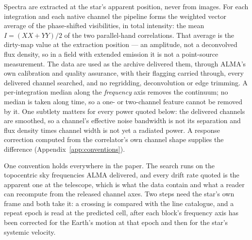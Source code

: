 Spectra are extracted at the star's apparent position, never from images.
For each integration and each native channel the pipeline forms the weighted
vector average of the phase-shifted visibilities, in total intensity: the
mean $I=(XX+YY)/2$ of the two parallel-hand correlations. That average is the
dirty-map value at the extraction position --- an amplitude, not a
deconvolved flux density, so in a field with extended emission it is not a
point-source measurement. The data are used as the archive delivered them,
through ALMA's own calibration and quality assurance, with their flagging
carried through, every delivered channel searched, and no regridding,
deconvolution or edge trimming. A per-integration median along the
\emph{frequency} axis removes the continuum; no median is taken along
time, so a one- or two-channel feature cannot be removed by it. One
subtlety matters for every power quoted below: the delivered channels are
smoothed, so a channel's effective noise bandwidth is not its separation
and flux density times channel width is not yet a radiated power. A
response correction computed from the correlator's own channel shape
supplies the difference (Appendix~\ref{app:conventions}).

One convention holds everywhere in the paper. The search runs on the
topocentric sky frequencies ALMA delivered, and every drift rate quoted is
the apparent one at the telescope, which is what the data contain and what
a reader can recompute from the released channel axes. Two steps need the
star's own frame and both take it: a crossing is compared with the line
catalogue, and a repeat epoch is read at the predicted cell, after each
block's frequency axis has been corrected for the Earth's motion at that
epoch and then for the star's systemic velocity.

